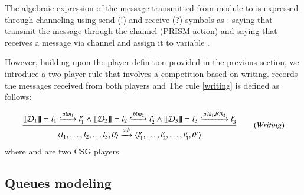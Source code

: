 

The algebraic expression of the message  transmitted from module  to  is expressed through channeling \cite{baierprinciples2008} using send (!) and receive (?) symbols as :  saying that   transmit the message through the channel  (PRISM action) and  saying that  receives a message via channel  and assign it to variable .


However, building upon the player definition provided in the previous section, we introduce a two-player rule that involves a competition based on writing.  records the messages received from both players  and The rule \ref{writing} is defined as follows:

\begin{boxD}
	      \begin{equation}\frac{\sset{\mathcal{D}_{1}}= l_{1}\gparrow{a!m_{1}}l'_{1} \wedge \sset{\mathcal{D}_{2}}= l_{2}\gparrow{b!m_{2} }l'_{2}  \wedge
        \sset{\mathcal{D}_{3}}= l_{3}\gparrow{a?k_{1}, b?k_{2}}l'_{3}        
       } {  \langle l_{1},\ldots,l_{2},\ldots l_{3},\theta\rangle  \xrightarrow{a,b}\langle l'_{1},\ldots,l'_{2},\ldots,l'_{3},\theta'\rangle } \tag{\emph{Writing}} \label{writing} \end{equation} where  and  are two CSG players.

\end{boxD}


\subsection{Queues modeling}
\label{sec:threats:manif}

